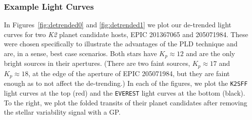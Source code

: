 \documentclass[]{emulateapj}
\begin{document}
\subsubsection{Example Light Curves}
\begin{figure*}[t]
  \begin{center}
    \leavevmode
       \caption{De-trended light curves for the campaign 1 star EPIC 201367065 \citep[K2-3,][]{CRO15}. \emph{Top}: The de-trended
                \texttt{K2SFF} flux (left) and the GP-smoothed flux folded on the periods of 
                the planets b, c, and d (right). \emph{Bottom}: The de-trended \texttt{EVEREST}
                flux. The 6-hr CDPP is 30.9 ppm for \texttt{K2SFF} and 16.6 ppm for
                \texttt{EVEREST}, a factor of $\sim$ 2 improvement.}
     \label{fig:detrended0}
  \end{center}
\end{figure*}
\begin{figure*}[t]
  \begin{center}
    \leavevmode
       \caption{De-trended light curves for EPIC 205071984, a campaign 2 star with three
                known planet candidates \citep{SIN15}. As in Figure~\ref{fig:detrended0}, the
                \texttt{K2SFF} light curve and the folded transits of EPIC 205071984.01 (b),
                205071984.02 (c), and 205071984.03 (d)
                are shown at the top; the equivalent plots for \texttt{EVEREST} are shown
                at the bottom. The 6-hr CDPP is 56.1 ppm for \texttt{K2SFF} and 24.0 ppm for
                \texttt{EVEREST}, a factor of $\gtrsim$ 2 improvement.}
     \label{fig:detrended1}
  \end{center}
\end{figure*}
In Figures~\ref{fig:detrended0} and \ref{fig:detrended1} we plot our de-trended light curves
for two \emph{K2} planet candidate hosts, EPIC 201367065 and 205071984. These were chosen
specifically to illustrate the advantages of the PLD technique and are, in a sense, best
case scenarios. Both stars have $K_p \approx 12$ and are the only bright sources in their
apertures. (There are two faint sources, $K_p \approx 17$ and $K_p \approx 18$, 
at the edge of the aperture of EPIC 205071984, but they are faint enough as to not affect
the de-trending.) In each of the figures, we plot the \texttt{K2SFF} light curves at the top (red)
and the \texttt{EVEREST} light curves at the bottom (black). To the right, we plot the folded
transits of their planet candidates after removing the stellar variability signal with a GP.
\end{document}
